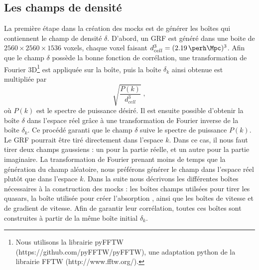 \documentclass[11pt, twoside, a4paper, openright]{report}
\begin{document}
\subsection{Les champs de densité}
\label{subsec:densityfields}
La première étape dans la création des mocks est de générer les boîtes qui contiennent le champ de densité $\delta$. D'abord, un GRF est généré dans une boite de $\num{2560}\times\num{2560}\times\num{1536}$ voxels, chaque voxel faisant  $d_{cell}^3 = (\SI{2.19}{\perh\Mpc})^3$.
Afin que le champ $\delta$ possède la bonne fonction de corrélation, une transformation de Fourier 3D\footnote{Nous utilisons la librairie pyFFTW (https://github.com/pyFFTW/pyFFTW), une adaptation python de la librairie FFTW (http://www.fftw.org/).} est appliquée sur la boîte, puis la boîte $\delta_k$ ainsi obtenue est multipliée par
\begin{equation}
  \sqrt{\frac{P(k)}{d_{cell}^3}} \; ,
\end{equation}
où $P(k)$ est le spectre de puissance désiré. Il est ensuite possible d'obtenir la boîte $\delta$ dans l'espace réel grâce à une transformation de Fourier inverse de la boîte $\delta_k$. Ce procédé garanti que le champ $\delta$ suive le spectre de puissance $P(k)$. 
Le GRF pourrait être tiré directement dans l'espace $k$. Dans ce cas, il nous faut tirer deux champs gaussiens : un pour la partie réelle, et un autre pour la partie imaginaire. La transformation de Fourier prenant moins de temps que la génération du champ aléatoire, nous préférons générer le champ dans l'espace réel plutôt que dans l'espace $k$.
Dans la suite nous décrivons les différentes boîtes nécessaires à la construction des mocks : les boîtes champs utilsées pour tirer les quasars, la boîte utilisée pour créer l'absorption \lya{}, ainsi que les boîtes de vitesse et de gradient de vitesse. Afin de garantir leur corrélation, toutes ces boîtes sont construites à partir de la même boîte initial $\delta_k$.
\end{document}
